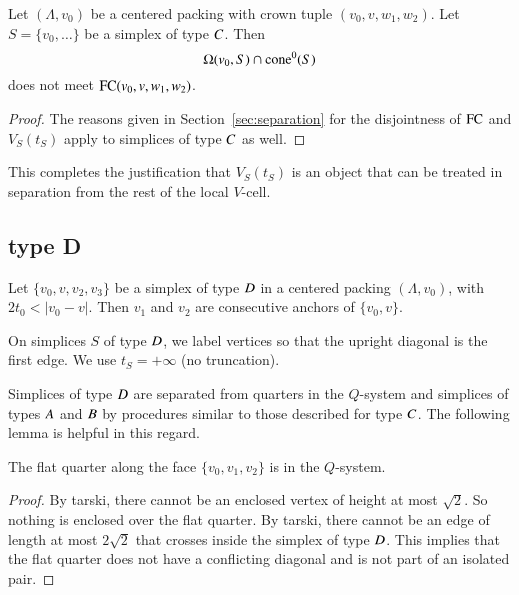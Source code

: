 \begin{lemma}
Let $(\Lambda,v_0)$ be a centered packing with crown tuple $(v_0,v,w_1,w_2)$.
Let $S=\{v_0,\ldots\}$ be a simplex of type $C$. Then
$$\Omega(v_0,S) \cap {\operatorname{cone}}^0(S)$$
does not meet ${\operatorname{FC}}(v_0,v,w_1,w_2)$.
\end{lemma}

\begin{proof}
The reasons given in Section~\ref{sec:separation} for the
disjointness of ${\operatorname{FC}}$ and $V_S(t_S)$ apply to simplices of
type $C$ as well. 
\end{proof}


This completes the justification that
$V_S(t_S)$ is an object that can be treated in separation from the
rest of the local $V$-cell.

\subsection{type D}%



\begin{lemma}
Let $\{v_0,v,v_2,v_3\}$ be a simplex of type $D$ 
in a centered packing $(\Lambda,v_0)$,
with $2t_0 < |v_0-v|$.
Then $v_1$ and $v_2$ are consecutive anchors of
$\{v_0,v\}$.
\end{lemma}

On simplices $S$ of type $D$, we label vertices so that the
upright diagonal is the first edge.  We use $t_S=+\infty$ (no
truncation).  

Simplices of type $D $ are separated from quarters in the
$Q$-system and simplices of types $A$ and $B$ by procedures
similar to those described for type $C$.  The following lemma is
helpful in this regard.


\begin{lemma}
The flat quarter along the face $\{v_0,v_1,v_2\}$ is
in the $Q$-system.
\end{lemma}

\begin{proof}
By tarski, there cannot be an enclosed vertex
of height at most $\sqrt2$. 
So nothing is enclosed over the flat quarter.
By tarski, there cannot be an edge of length
at most $2\sqrt2$ that crosses inside the simplex of type $D$.
This implies that the flat quarter does not have
a conflicting diagonal and is not part of an isolated pair.
\end{proof}


